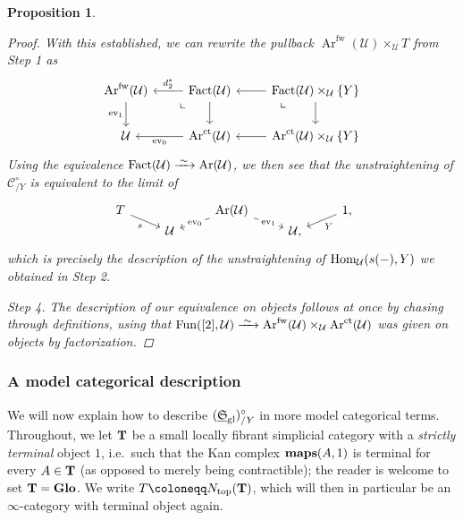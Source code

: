 \documentclass[reqno]{memo-l}
\theoremstyle{mythm}
\newtheorem{prop}[thm]{Proposition}
\theoremstyle{definition}
\numberwithin{equation}{section}
\newcommand{\Cc}{{\mathcal{C}}}
\newcommand{\Uu}{{\mathcal{U}}}
\newcommand{\gl}{\textup{gl}}
\DeclareMathOperator{\ev}{ev}
\renewcommand{\hom}{\textup{hom}}
\newcommand{\Fun}{{\textup{Fun}}}
\DeclareMathOperator{\Ar}{Ar}
\newcommand{\cat}[1]{\textbf{\textup{#1}}}
\newcommand{\maps}{\cat{maps}}
\renewcommand{\hom}{{\textup{Hom}}}
\newcommand{\ct}{\textup{ct}}
\newcommand{\ulhelper}[2]{\underline{\setbox0=\hbox{$#1#2$}\dp0=0.4pt \box0\relax}}
\newcommand{\ul}[1]{{\mathpalette\ulhelper{#1}}\hbox{\rule[-2pt]{0pt}{0pt}}}
\newcommand{\iso}{\xrightarrow{\;\smash{\raisebox{-0.25ex}{\ensuremath{\scriptstyle\sim}}}\;}}
\newcommand{\myS}{{{\mathfrak S\kern-.4pt}}}
\begin{document}
\begin{prop}
\begin{proof}
        With this established, we can rewrite the pullback $\Ar^\text{fw}(\Uu)\times_\Uu T$ from Step 1 as
        \[
            \begin{tikzcd}
                \Ar^\text{fw}(\Uu)\arrow[d,"\ev_1"'] &\arrow[l,"d_2^*"'] \text{Fact}(\Uu)\arrow[d]\arrow[dl,phantom,"\llcorner"{very near start}] &\arrow[dl,phantom,"\llcorner"{very near start}] \text{Fact}(\Uu)\times_\Uu\{Y\}\arrow[d]\arrow[l]\\
                \Uu & \arrow[l, "\ev_0"] \Ar^\ct(\Uu) & \arrow[l] \Ar^\ct(\Uu)\times_{\Uu}\{Y\}
            \end{tikzcd}
        \]
        Using the equivalence $\text{Fact}(\Uu)\iso\Ar(\Uu)$, we then see that the unstraightening of $\Cc_{/Y}^\circ$ is equivalent to the limit of
        \[
            \begin{tikzcd}[row sep=0ex]
                T\arrow[dr, "s"'] && \arrow[dl,"\ev_0"{description}]\Ar(\Uu)\arrow[dr,"\ev_1"{description}] && \arrow[dl,"Y"]1\rlap,\\
                & \Uu && \Uu,
            \end{tikzcd}
        \]
        which is precisely the description of the unstraightening of $\hom_\Uu(s(-),Y)$ we obtained in Step 2.

        \smallskip
        \textit{Step 4.} The description of our equivalence on objects follows at once by chasing through definitions, using that $\Fun([2],\Uu)\iso\Ar^\text{fw}(\Uu)\times_\Uu\Ar^\ct(\Uu)$ was given on objects by factorization.
    \end{proof}
\end{prop}

\subsubsection{A model categorical description} 
We will now explain how to describe $(\ul\myS_\gl)_{/Y}^\circ$ in more model categorical terms. Throughout, we let $\cat{T}$ be a small locally fibrant simplicial category with a \emph{strictly terminal} object $1$, i.e.\ such that the Kan complex $\maps(A,1)$ is terminal for every $A\in\cat{T}$ (as opposed to merely being contractible); the reader is welcome to set $\cat{T}=\cat{Glo}$. We write $T\coloneqq N_\textup{top}(\cat{T})$, which will then in particular be an $\infty$-category with terminal object again.
\end{document}
